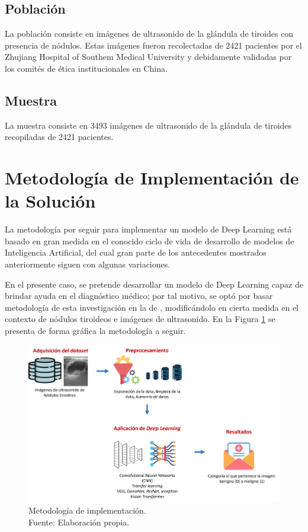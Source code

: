 \subsection{Población}
La población consiste en imágenes de ultrasonido de la glándula de tiroides con presencia de nódulos. Estas imágenes fueron recolectadas de 2421 pacientes por el Zhujiang Hospital of Southem Medical University y debidamente validadas por los comités de ética institucionales en China.

\subsection{Muestra}
La muestra consiste en 3493 imágenes de ultrasonido de la glándula de tiroides recopiladas de 2421 pacientes.

\section{Metodología de Implementación de la Solución}
La metodología por seguir para implementar un modelo de Deep Learning está basado en gran medida en el conocido ciclo de vida de desarrollo de modelos de Inteligencia Artificial, del cual gran parte de los antecedentes mostrados anteriormente siguen con algunas variaciones. 

En el presente caso, se pretende desarrollar un modelo de Deep Learning capaz de brindar ayuda en el diagnóstico médico; por tal motivo, se optó por basar metodología de esta investigación en la de \cite{pr_monroy2021disvc}, modificándolo en cierta medida en el contexto de nódulos tiroideos e imágenes de ultrasonido. En la Figura \ref{3:fig301} se presenta de forma gráfica la metodología a seguir.

\begin{figure}[H]
	\begin{center}
		\includegraphics[width=1.00\textwidth]{3/figures/metod_classthy1.jpg}
		\caption[Metodología de implementación]{Metodología de implementación. \\
		Fuente: Elaboración propia.}
		\label{3:fig301}
	\end{center}
\end{figure}

